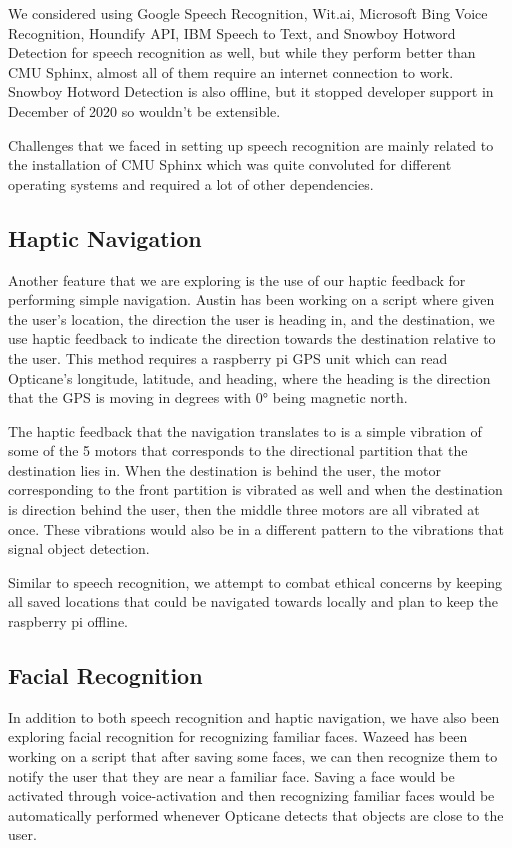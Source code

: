\documentclass{article}
\begin{document}
We considered using Google Speech Recognition, Wit.ai, Microsoft Bing Voice Recognition, Houndify API, IBM Speech to Text, and Snowboy Hotword Detection for speech recognition as well, but while they perform better than CMU Sphinx, almost all of them require an internet connection to work. Snowboy Hotword Detection is also offline, but it stopped developer support in December of 2020 so wouldn't be extensible.

Challenges that we faced in setting up speech recognition are mainly related to the installation of CMU Sphinx which was quite convoluted for different operating systems and required a lot of other dependencies.

\subsection{Haptic Navigation}

Another feature that we are exploring is the use of our haptic feedback for performing simple navigation. Austin has been working on a script where given the user's location, the direction the user is heading in, and the destination, we use haptic feedback to indicate the direction towards the destination relative to the user. This method requires a raspberry pi GPS unit which can read Opticane's longitude, latitude, and heading, where the heading is the direction that the GPS is moving in degrees with 0° being magnetic north.

The haptic feedback that the navigation translates to is a simple vibration of some of the 5 motors that corresponds to the directional partition that the destination lies in. When the destination is behind the user, the motor corresponding to the front partition is vibrated as well and when the destination is direction behind the user, then the middle three motors are all vibrated at once. These vibrations would also be in a different pattern to the vibrations that signal object detection.

Similar to speech recognition, we attempt to combat ethical concerns by keeping all saved locations that could be navigated towards locally and plan to keep the raspberry pi offline.

\subsection{Facial Recognition}

In addition to both speech recognition and haptic navigation, we have also been exploring facial recognition for recognizing familiar faces. Wazeed has been working on a script that after saving some faces, we can then recognize them to notify the user that they are near a familiar face. Saving a face would be activated through voice-activation and then recognizing familiar faces would be automatically performed whenever Opticane detects that objects are close to the user.
\end{document}
